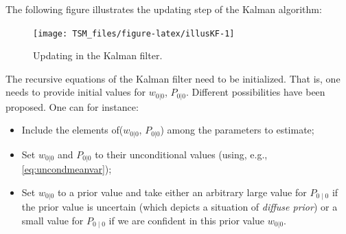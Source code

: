 \documentclass[
  12pt,
]{book}
\providecommand{\tightlist}{%
  \setlength{\itemsep}{0pt}\setlength{\parskip}{0pt}}
\theoremstyle{definition}
\theoremstyle{definition}
\theoremstyle{definition}
\theoremstyle{definition}
\theoremstyle{remark}
\begin{document}
The following figure illustrates the updating step of the Kalman algorithm:

\begin{figure}
\texttt{[image: TSM\_files/figure-latex/illusKF-1]} \caption{Updating in the Kalman filter.}\label{fig:illusKF}
\end{figure}

The recursive equations of the Kalman filter need to be initialized. That is, one needs to provide initial values for \(w_{0|0}\), \(P_{0|0}\). Different possibilities have been proposed. One can for instance:

\begin{itemize}
\tightlist
\item
  Include the elements of(\(w_{0|0}\), \(P_{0|0}\)) among the parameters to estimate;
\item
  Set \(w_{0|0}\) and \(P_{0|0}\) to their unconditional values (using, e.g., \eqref{eq:uncondmeanvar});
\item
  Set \(w_{0|0}\) to a prior value and take either an arbitrary large value for \(P_{0\mid0}\) if the prior value is uncertain (which depicts a situation of \emph{diffuse prior}) or a small value for \(P_{0\mid0}\) if we are confident in this prior value \(w_{0|0}\).
\end{itemize}
\end{document}
